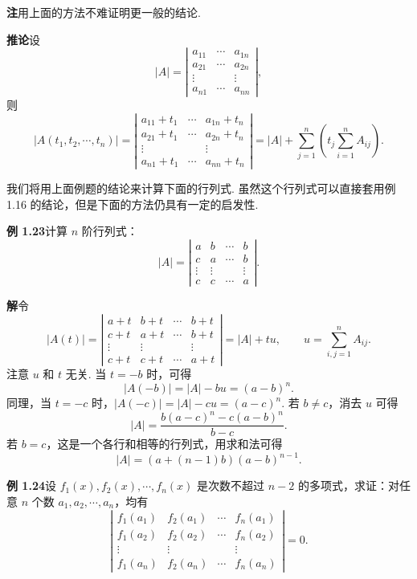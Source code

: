 \documentclass[UTF8,12pt,a4paper,fontset=fandol]{ctexart}
\begin{document}
\noindent\textbf{注}\quad 用上面的方法不难证明更一般的结论.

\noindent\textbf{推论}\quad 设
\[
|A|=\left|\begin{array}{ccc}
a_{11} & \cdots & a_{1n}\\
a_{21} & \cdots & a_{2n}\\
\vdots &        & \vdots\\
a_{n1} & \cdots & a_{nn}
\end{array}\right|,
\]
则
\[
|A(t_1,t_2,\cdots,t_n)|
=\left|\begin{array}{ccc}
a_{11}+t_1 & \cdots & a_{1n}+t_n\\
a_{21}+t_1 & \cdots & a_{2n}+t_n\\
\vdots &        & \vdots\\
a_{n1}+t_1 & \cdots & a_{nn}+t_n
\end{array}\right|
=|A|+\sum_{j=1}^n\left(t_j\sum_{i=1}^n A_{ij}\right).
\]

我们将用上面例题的结论来计算下面的行列式. 虽然这个行列式可以直接套用例 1.16 的结论，但是下面的方法仍具有一定的启发性.

\noindent\textbf{例 1.23}\quad 计算 $n$ 阶行列式：
\[
|A|=\left|\begin{array}{cccc}
a & b & \cdots & b\\
c & a & \cdots & b\\
\vdots & \vdots &        & \vdots\\
c & c & \cdots & a
\end{array}\right|.
\]

\noindent\textbf{解}\quad 令
\[
|A(t)|=\left|\begin{array}{cccc}
a+t & b+t & \cdots & b+t\\
c+t & a+t & \cdots & b+t\\
\vdots & \vdots &        & \vdots\\
c+t & c+t & \cdots & a+t
\end{array}\right|=|A|+tu,\qquad u=\sum_{i,j=1}^n A_{ij}.
\]
注意 $u$ 和 $t$ 无关. 当 $t=-b$ 时，可得
\[
|A(-b)|=|A|-bu=(a-b)^n.
\]
同理，当 $t=-c$ 时，$|A(-c)|=|A|-cu=(a-c)^n$. 若 $b\ne c$，消去 $u$ 可得
\[
|A|=\frac{b(a-c)^n-c(a-b)^n}{b-c}.
\]
若 $b=c$，这是一个各行和相等的行列式，用求和法可得
\[
|A|=(a+(n-1)b)(a-b)^{n-1}.
\]

\noindent\textbf{例 1.24}\quad 设 $f_1(x),f_2(x),\cdots,f_n(x)$ 是次数不超过 $n-2$ 的多项式，求证：对任意 $n$ 个数 $a_1,a_2,\cdots,a_n$，均有
\[
\left|\begin{array}{cccc}
f_1(a_1) & f_2(a_1) & \cdots & f_n(a_1)\\
f_1(a_2) & f_2(a_2) & \cdots & f_n(a_2)\\
\vdots & \vdots &        & \vdots\\
f_1(a_n) & f_2(a_n) & \cdots & f_n(a_n)
\end{array}\right|=0.
\]
\end{document}
